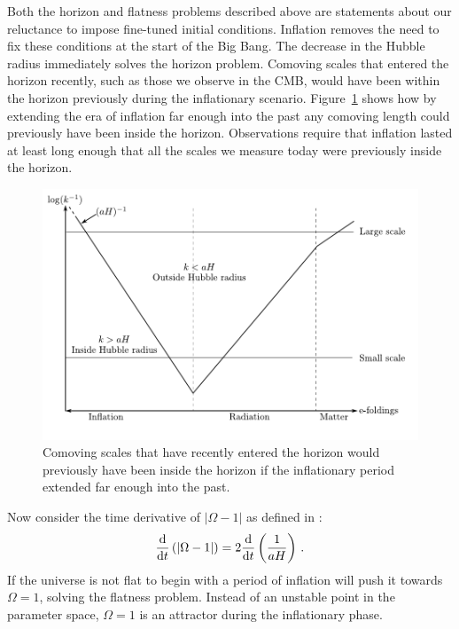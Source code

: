Both the horizon and flatness problems described above are statements about our
reluctance to impose fine-tuned initial conditions. Inflation removes the need
to fix these conditions at the start of the Big Bang.
The decrease in the Hubble radius immediately solves the horizon problem.
Comoving scales that entered the horizon recently, such as those we observe in
the CMB, would have been within the horizon previously during the inflationary
scenario. Figure~\ref{fig:comovingscales-intro} shows how by extending
the era of inflation far enough into the past any comoving length could
previously have been inside the horizon.
Observations require that inflation lasted at least long enough that all the
scales we measure today were previously inside the horizon. 
% 
\begin{figure}
 \includegraphics[width=\textwidth]{graphs/scales.pdf}
 \caption[Comoving scales and the Hubble radius]{Comoving scales that have recently
entered the horizon would
previously have been inside the horizon if the inflationary period extended far
enough into the past.}
 \label{fig:comovingscales-intro}
\end{figure}
% 

Now consider the time derivative of $|\Omega -1|$ as defined in
:
% 
\begin{equation}
 \label{eq:omegaderiv-intro}
 \frac{\mathrm{d}}{\mathrm{d} t}\left(|\Omega -1 |\right) = 2\frac{\mathrm{d}}{\mathrm{d} t}
\left(\frac{1}{aH}\right)\,.
\end{equation}
% 
If the universe is not flat to begin with a period of inflation will push it
towards $\Omega=1$, solving the flatness problem. Instead of an unstable point
in the parameter space, $\Omega=1$ is an attractor during the inflationary
phase. 
% 

